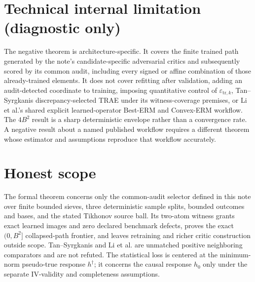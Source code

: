 \documentclass{article}
\begin{document}
\section*{Technical internal limitation (diagnostic only)}

The negative theorem is architecture-specific. It covers the finite trained path generated by the note's candidate-specific adversarial critics and subsequently scored by its common audit, including every signed or affine combination of those already-trained elements. It does not cover refitting after validation, adding an audit-detected coordinate to training, imposing quantitative control of \(\varepsilon_{\mathrm{tr},k}\), Tan--Syrgkanis discrepancy-selected TRAE under its witness-coverage premises, or Li et al.'s shared explicit learned-operator Best-ERM and Convex-ERM workflow. The \(4B^2\) result is a sharp deterministic envelope rather than a convergence rate. A negative result about a named published workflow requires a different theorem whose estimator and assumptions reproduce that workflow accurately.

\section{Honest scope}

The formal theorem concerns only the common-audit selector defined in this note over finite bounded sieves, three deterministic sample splits, bounded outcomes and bases, and the stated Tikhonov source ball. Its two-atom witness grants exact learned images and zero declared benchmark defects, proves the exact \((0,B^2]\) collapsed-path frontier, and leaves retraining and richer critic construction outside scope. Tan--Syrgkanis and Li et al. are unmatched positive neighboring comparators and are not refuted. The statistical loss is centered at the minimum-norm pseudo-true response \(h^\dagger\); it concerns the causal response \(h_0\) only under the separate IV-validity and completeness assumptions.
\end{document}
